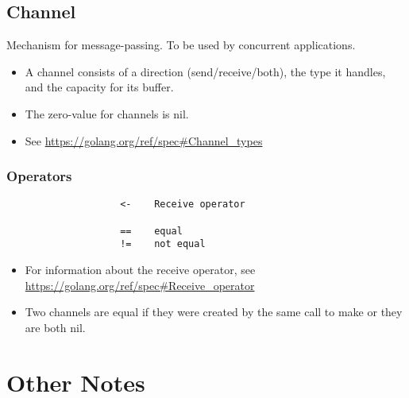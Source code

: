 \documentclass{article}
\begin{document}
	\subsection{Channel}
		Mechanism for message-passing. To be used by concurrent applications.
		\begin{itemize}
			\item A channel consists of a direction (send/receive/both), the type it handles, and the capacity for its buffer. 
			\item The zero-value for channels is \colorbox{code}{nil}.
			\item See \url{https://golang.org/ref/spec#Channel_types}
		\end{itemize}
		\subsubsection{Operators}
			\begin{verbatim}
				    <-    Receive operator
				    
				    ==    equal
				    !=    not equal
			\end{verbatim}
			\begin{itemize}
				\item For information about the receive operator, see \url{https://golang.org/ref/spec#Receive_operator}
				\item Two channels are equal if they were created by the same call to \colorbox{code}{make} or they are both \colorbox{code}{nil}.
			\end{itemize}
	
\section{Other Notes}
\end{document}
